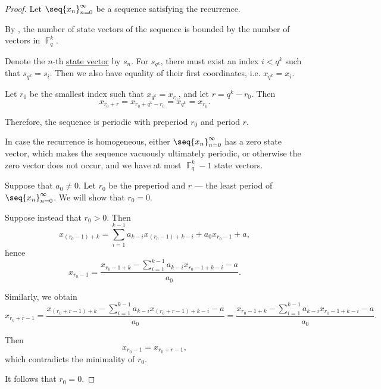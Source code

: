 \begin{proof}
  Let \( \seq{ x_n }_{n=0}^\infty \) be a sequence satisfying the recurrence.

   By , the number of state vectors of the sequence is bounded by the number of vectors in \( \BbbF_q^k \).

  Denote the \( n \)-th \hyperref[def:recurrence_relation/state]{state vector} by \( s_n \). For \( s_{q^k} \), there must exist an index \( i < q^k \) such that \( s_{q^k} = s_i \). Then we also have equality of their first coordinates, i.e. \( x_{q^k} = x_i \).

  Let \( r_0 \) be the smallest index such that \( x_{q^k} = x_{r_0} \), and let \( r = q^k - r_0 \). Then
  \begin{equation*}
    x_{r_0 + r} = x_{r_0 + q^k - r_0} = x_{q^k} = x_{r_0}.
  \end{equation*}

  Therefore, the sequence is periodic with preperiod \( r_0 \) and period \( r \).

   In case the recurrence is homogeneous, either \( \seq{ x_n }_{n=0}^\infty \) has a zero state vector, which makes the sequence vacuously ultimately periodic, or otherwise the zero vector does not occur, and we have at most \( \BbbF_q^k - 1 \) state vectors.

   Suppose that \( a_0 \neq 0 \). Let \( r_0 \) be the preperiod and \( r \) --- the least period of \( \seq{ x_n }_{n=0}^\infty \). We will show that \( r_0 = 0 \).

  Suppose instead that \( r_0 > 0 \). Then
  \begin{equation*}
    x_{(r_0-1)+k} = \sum_{i=1}^{k-1} a_{k-i} x_{(r_0-1)+k-i} + a_0 x_{r_0-1} + a,
  \end{equation*}
  hence
  \begin{equation*}
    x_{r_0-1}
    =
    \frac {x_{r_0-1+k} - \sum_{i=1}^{k-1} a_{k-i} x_{r_0-1+k-i} - a} {a_0}.
  \end{equation*}

  Similarly, we obtain
  \begin{equation*}
    x_{r_0+r-1}
    =
    \frac {x_{(r_0+r-1)+k} - \sum_{i=1}^{k-1} a_{k-i} x_{(r_0+r-1)+k-i} - a} {a_0}
    =
    \frac {x_{r_0-1+k} - \sum_{i=1}^{k-1} a_{k-i} x_{r_0-1+k-i} - a} {a_0}.
  \end{equation*}

  Then
  \begin{equation*}
    x_{r_0-1} = x_{r_0+r-1},
  \end{equation*}
  which contradicts the minimality of \( r_0 \).

  It follows that \( r_0 = 0 \).
\end{proof}

